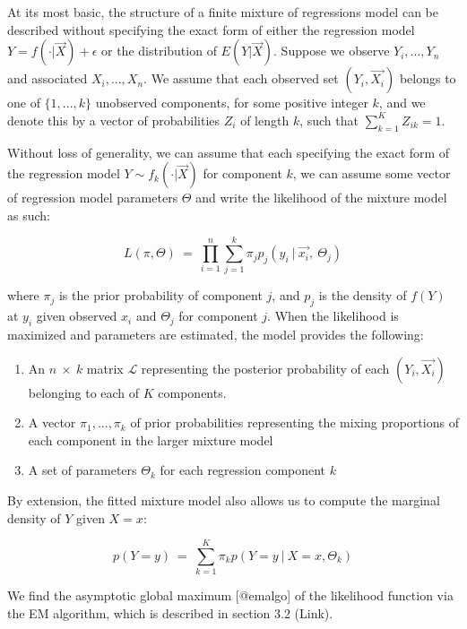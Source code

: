 \documentclass[fleqn,10pt]{olplainarticle}\usepackage[]{graphicx}\usepackage[]{color}
\begin{document}
At its most basic, the structure of a finite mixture of regressions model can be described without specifying the exact form of either the regression model $Y = f(\cdot|\vec{X}) + \epsilon$ or the distribution of $E(Y|\vec{X})$. Suppose we observe $Y_i,...,Y_n$ and associated $X_i,...,X_n$. We assume that each observed set $(Y_i, \vec{X_i})$ belongs to one of $\{1,...,k\}$ unobserved components, for some positive integer $k$, and we denote this by a vector of probabilities $Z_i$ of length $k$, such that $\sum_{k=1}^{K}Z_{ik} = 1$.

Without loss of generality, we can assume that each specifying the exact form of the regression model $Y \sim f_k(\cdot|\vec{X})$ for component $k$, we can assume some vector of regression model parameters $\Theta$ and write the likelihood of the mixture model as such:

\begin{equation} \label{mixlik}
  L(\pi, \Theta) \ =\ \prod_{i=1}^n \sum_{j=1}^k \pi_j p_j(y_i\ |\ \vec{x_i},\ \Theta_j)
\end{equation}


where $\pi_j$ is the prior probability of component $j$, and $p_j$ is the density of $f(Y)$ at $y_i$ given observed $x_i$ and $\Theta_j$ for component $j$. When the likelihood is maximized and parameters are estimated, the model provides the following:

\begin{enumerate}[noitemsep] 
  \item An $n \ \times\ k$ matrix $\mathcal{L}$ representing the posterior probability of each $(Y_i, \vec{X_i})$ belonging to each of $K$ components. 
  \item A vector $\pi_1,...,\pi_k$ of prior probabilities representing the mixing proportions of each component in the larger mixture model
  \item A set of parameters $\Theta_k$ for each regression component $k$ 
\end{enumerate}

By extension, the fitted mixture model also allows us to compute the marginal density of $Y$ given $X = x$:

\begin{equation} \label{mixmarg}
  p(Y = y) \ =\ \sum_{k=1}^{K}\pi_k p(Y = y\ |\ X = x, \Theta_k)
\end{equation}

We find the asymptotic global maximum [@emalgo] of the likelihood function via the EM algorithm, which is described in section 3.2 (Link).
\end{document}
